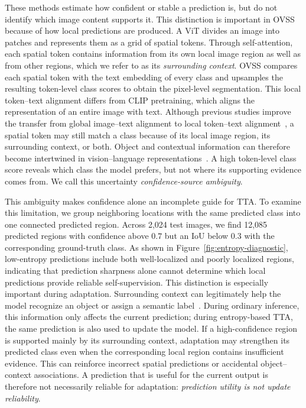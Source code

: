\documentclass[letterpaper]{article}
\begin{document}
	These methods estimate how confident or stable a prediction is, but do not identify which image content supports it. This distinction is important in OVSS because of how local predictions are produced. A ViT divides an image into patches and represents them as a grid of spatial tokens. Through self-attention, each spatial token contains information from its own local image region as well as from other regions, which we refer to as its \emph{surrounding context}. OVSS compares each spatial token with the text embedding of every class and upsamples the resulting token-level class scores to obtain the pixel-level segmentation. This local token--text alignment differs from CLIP pretraining, which aligns the representation of an entire image with text. Although previous studies improve the transfer from global image--text alignment to local token--text alignment~\cite{mukhoti2023pacl,wu2024clipself,hajimiri2025naclip,shao2024cliptrase}, a spatial token may still match a class because of its local image region, its surrounding context, or both. Object and contextual information can therefore become intertwined in vision--language representations~\cite{kim2025cass,li2025densevlm}. A high token-level class score reveals which class the model prefers, but not where its supporting evidence comes from. We call this uncertainty \emph{confidence-source ambiguity}.
	
	This ambiguity makes confidence alone an incomplete guide for TTA. To examine this limitation, we group neighboring locations with the same predicted class into one connected predicted region. Across 2,024 test images, we find 12,085 predicted regions with confidence above $0.7$ but an IoU below $0.3$ with the corresponding ground-truth class. As shown in Figure~\ref{fig:entropy-diagnostic}, low-entropy predictions include both well-localized and poorly localized regions, indicating that prediction sharpness alone cannot determine which local predictions provide reliable self-supervision. This distinction is especially important during adaptation. Surrounding context can legitimately help the model recognize an object or assign a semantic label~\cite{xiao2021backgrounds,kim2025cass}. During ordinary inference, this information only affects the current prediction; during entropy-based TTA, the same prediction is also used to update the model. If a high-confidence region is supported mainly by its surrounding context, adaptation may strengthen its predicted class even when the corresponding local region contains insufficient evidence. This can reinforce incorrect spatial predictions or accidental object--context associations. A prediction that is useful for the current output is therefore not necessarily reliable for adaptation: \emph{prediction utility is not update reliability}.
	
\end{document}
